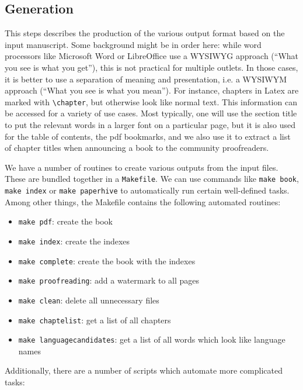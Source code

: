 \documentclass[guidelines,nonflat,modfonts] {langsci/langscibook}
\begin{document}
\subsection{Generation}
This steps describes the production of the various output format based on the input manuscript. Some background might be in order here: while word processors like Microsoft Word or LibreOffice use a WYSIWYG approach (``What you see is what you get''), this is not practical for multiple outlets.
In those cases, it is better to use a separation of meaning and presentation, i.e. a WYSIWYM approach (``What you see is what you mean''). For instance, chapters in Latex are marked with \verb+\chapter+, but otherwise look like normal text. This information can be accessed for a variety of use cases. Most typically, one will use the section title to put the relevant words in a larger font on a particular  page, but it is also used for the table of contents, the pdf bookmarks, and we also use it to extract a list of chapter titles when announcing a book to the community proofreaders. 

We have a number of routines to create various outputs from the input files. These are bundled together in a \verb+Makefile+. We can use commands like \verb+make book+, \verb+make index+ or \verb+make paperhive+ to automatically run certain well-defined tasks. Among other things, the Makefile contains the following automated routines: 

\begin{itemize}
 \item \texttt{make pdf}: create the book 
 \item \texttt{make index}: create the indexes
 \item \texttt{make complete}: create the book with the indexes 
 \item \texttt{make proofreading}: add a watermark to all pages 
 \item \texttt{make clean}: delete all unnecessary files 
 \item \texttt{make chaptelist}: get a list of all chapters 
 \item \texttt{make languagecandidates}: get a list of all words which look like language names
\end{itemize}

Additionally, there are a number of scripts which automate more complicated tasks: 
\end{document}
